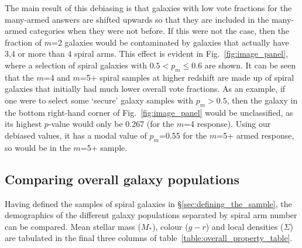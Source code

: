 \documentclass[useAMS,usenatbib]{mn2e}
\begin{document}
The main result of this debiasing is that galaxies with low vote fractions for the many-armed answers are shifted upwards so that they are included in the many-armed categories when they were not before. If this were not the case, then the fraction of $m$=2 galaxies would be contaminated by galaxies that actually have 3,4 or more than 4 spiral arms. This effect is evident in Fig.~\ref{fig:image_panel}, where a selection of spiral galaxies with $0.5 < p_m \leq 0.6$ are shown. It can be seen that the $m$=4 and $m$=5+ spiral samples at higher redshift are made up of spiral galaxies that initially had much lower overall vote fractions. As an example, if one were to select some `secure' galaxy samples with $p_m>0.5$, then the galaxy in the bottom right-hand corner of Fig.~\ref{fig:image_panel} would be unclassified, as its highest $p$-value would only be 
0.267 (for the $m$=4 response). Using our debiased values, it has a modal value of $p_m$=0.55 for the $m$=5+ armed response, so would be in the $m$=5+ sample. 

\subsection{Comparing overall galaxy populations}
\label{sec:comparison}

Having defined the samples of spiral galaxies in \S\ref{sec:defining_the_sample}, the demographics of the different galaxy populations separated by spiral arm number can be compared. Mean stellar mass ($M_*$), colour ($g-r$) and local densities ($\Sigma$) are tabulated in the final three columns of table~\ref{table:overall_property_table}.
\end{document}
